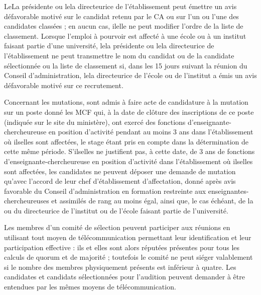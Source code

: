 Le\mp La pr\'esident\mp e ou le\mp la directeur\mp ice de l'\'etablissement peut \'emettre un avis d\'efavorable motiv\'e sur le candidat retenu par
le CA ou sur l'un ou l'une des candidat\mp e\mp s class\'e\mp e\mp s ; en aucun cas, il\mp elle ne peut modifier l'ordre de la liste de classement.
Lorsque l'emploi \`a pourvoir est affect\'e \`a une \'ecole ou \`a un institut faisant partie d'une universit\'e, le\mp la pr\'esident\mp e ou
le\mp la directeur\mp ice de l'\'etablissement ne peut transmettre le nom du candidat ou de la candidate s\'electionn\'e\mp e ou la liste de classement si,
dans les 15 jours suivant la r\'eunion du Conseil d'administration, le\mp la directeur\mp ice de l'\'ecole ou de l'institut a \'emis un
avis d\'efavorable motiv\'e sur ce recrutement.

Concernant les mutations, sont admis \`a faire acte de candidature \`a la mutation sur un poste donn\'e les MCF qui, \`a la date de cl\^oture des inscriptions de ce poste (indiqu\'ee sur le site du minist\`ere), ont exerc\'e des fonctions d'enseignant\mp e-chercheur\mp euse en position d'activit\'e pendant au moins 3 ans dans l'\'etablissement o\`u ils\mp elles sont affect\'e\mp e\mp s, le stage \'etant pris en compte dans la d\'etermination de cette m\^eme p\'eriode. S'ils\mp elles ne justifient pas, \`a cette date, de 3 ans de fonctions d'enseignant\mp e-chercheur\mp euse en position d'activit\'e dans l'\'etablissement o\`u ils\mp elles sont affect\'e\mp e\mp s, les candidat\mp e\mp s ne peuvent d\'eposer une demande de mutation qu'avec l'accord de leur chef d'\'etablissement d'affectation, donn\'e apr\`es avis favorable du Conseil d'administration en formation restreinte aux enseignant\mp e\mp s-chercheur\mp euse\mp s et assimil\'es de rang au moins \'egal, ainsi que, le cas \'ech\'eant, de la ou du directeur\mp ice de l'institut ou de l'\'ecole faisant partie de l'universit\'e.

Les membres d'un comit\'e de s\'election peuvent participer aux r\'eunions en utilisant tout moyen de 
t\'el\'ecom\-munication permettant leur identification et leur participation effective : ils et elles sont alors r\'eput\'e\mp e\mp s pr\'esent\mp e\mp s pour
tous les calculs de quorum et de majorit\'e ; toutefois le comit\'e ne peut si\'eger valablement si le nombre des
membres physiquement pr\'esents est inf\'erieur \`a quatre.
Les candidates et candidats s\'electionn\'e\mp e\mp s pour l'audition peuvent demander \`a \^etre entendu\mp e\mp s par les m\^emes moyens de
t\'el\'ecommunication.

